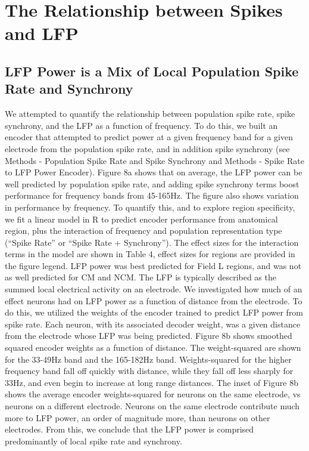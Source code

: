 \chapter{The Relationship between Spikes and LFP}

\section{LFP Power is a Mix of Local Population Spike Rate and Synchrony}

    We attempted to quantify the relationship between population spike rate, spike synchrony, and the LFP as a function of frequency. To do this, we built an encoder that attempted to predict power at a given frequency band for a given electrode from the population spike rate, and in addition spike synchrony (see Methods - Population Spike Rate and Spike Synchrony and Methods - Spike Rate to LFP Power Encoder).
    Figure 8a shows that on average, the LFP power can be well predicted by population spike rate, and adding spike synchrony terms boost performance for frequency bands from 45-165Hz. The figure also shows variation in performance by frequency. To quantify this, and to explore region specificity, we fit a linear model in R to predict encoder performance from anatomical region, plus the interaction of frequency and population representation type (“Spike Rate” or “Spike Rate + Synchrony”). The effect sizes for the interaction terms in the model are shown in Table 4, effect sizes for regions are provided in the figure legend. LFP power was best predicted for Field L regions, and was not as well predicted for CM and NCM.
    The LFP is typically described as the summed local electrical activity on an electrode. We investigated how much of an effect neurons had on LFP power as a function of distance from the electrode. To do this, we utilized the weights of the encoder trained to predict LFP power from spike rate. Each neuron, with its associated decoder weight, was a given distance from the electrode whose LFP was being predicted. Figure 8b shows smoothed squared encoder weights as a function of distance. The weight-squared are shown for the 33-49Hz band and the 165-182Hz band. Weights-squared for the higher frequency band fall off quickly with distance, while they fall off less sharply for 33Hz, and even begin to increase at long range distances. The inset of Figure 8b shows the average encoder weights-squared for neurons on the same electrode, vs neurons on a different electrode. Neurons on the same electrode contribute much more to LFP power, an order of magnitude more, than neurons on other electrodes. From this, we conclude that the LFP power is comprised predominantly of local spike rate and synchrony.

